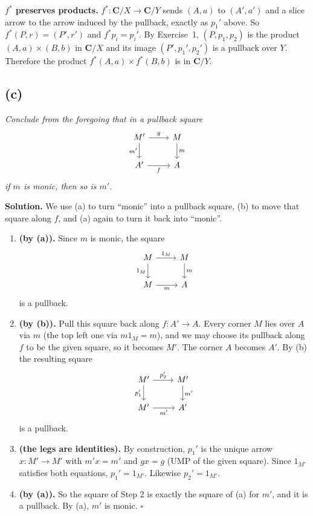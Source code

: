 \documentclass[11pt]{article}
\begin{document}
\textbf{$f^*$ preserves products.} $f^* : \mathbf{C}/X \to \mathbf{C}/Y$ sends
$(A,a)$ to $(A',a')$ and a slice arrow to the arrow induced by the pullback,
exactly as $p_1'$ above. So $f^*(P,r) = (P',r')$ and $f^*p_i = p_i'$. By
Exercise~1, $(P,p_1,p_2)$ is the product $(A,a) \times (B,b)$ in
$\mathbf{C}/X$ and  its image $(P',p_1',p_2')$ is a pullback over $Y$.
Therefore the product $f^*(A,a) \times f^*(B,b)$ is in $\mathbf{C}/Y$.

\subsection*{(c)}

\textit{Conclude from the foregoing that in a pullback square}
\[
\begin{tikzcd}
  M' \ar[r, "g"] \ar[d, "m'"'] & M \ar[d, "m"] \\
  A' \ar[r, "f"'] & A
\end{tikzcd}
\]
\textit{if $m$ is monic, then so is $m'$.}

\medskip
\textbf{Solution.} We use (a) to turn ``monic'' into a pullback square, (b) to
move that square along $f$, and (a) again to turn it back into ``monic''.

\begin{enumerate}
  \item \textbf{(by (a)).} Since $m$ is monic, the square
    \[
      \begin{tikzcd}
        M \ar[r, "1_M"] \ar[d, "1_M"'] & M \ar[d, "m"] \\
        M \ar[r, "m"'] & A
      \end{tikzcd}
    \]
    is a pullback.
  \item \textbf{(by (b)).} Pull this square back along $f : A' \to A$. Every
    corner $M$ lies over $A$ via $m$ (the top left one via $m 1_M = m$), and we
    may choose its pullback along $f$ to be the given square, so it becomes
    $M'$. The corner $A$ becomes $A'$. By (b) the resulting square
    \[
      \begin{tikzcd}
        M' \ar[r, "p_2'"] \ar[d, "p_1'"'] & M' \ar[d, "m'"] \\
        M' \ar[r, "m'"'] & A'
      \end{tikzcd}
    \]
    is a pullback.
  \item \textbf{(the legs are identities).} By construction, $p_1'$ is the
    unique arrow $x : M' \to M'$ with $m' x = m'$ and $g x = g$ (UMP of the
    given square). Since $1_{M'}$ satisfies both equations, $p_1' = 1_{M'}$.
    Likewise $p_2' = 1_{M'}$.
  \item \textbf{(by (a)).} So the square of Step 2 is exactly the square of (a)
    for $m'$, and it is a pullback. By (a), $m'$ is monic. \hfill$\square$
\end{enumerate}
\end{document}
